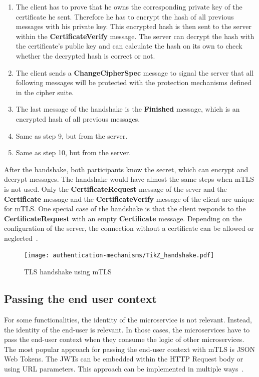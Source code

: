 \begin{enumerate}
	\item The client has to prove that he owns the corresponding private key of the certificate he sent.
		Therefore he has to encrypt the hash of all previous messages with his private key.
		This encrypted hash is then sent to the server within the \textbf{CertificateVerify} message.
		The server can decrypt the hash with the certificate's public key and can calculate the hash on its own to check whether the decrypted hash is correct or not.
	\item The client sends a \textbf{ChangeCipherSpec} message to signal the server that all following messages will be protected with the protection mechanisms defined in the cipher suite.
	\item The last message of the handshake is the \textbf{Finished} message, which is an encrypted hash of all previous messages.
	\item Same as step 9, but from the server.
	\item Same as step 10, but from the server.
\end{enumerate}
After the handshake, both participants know the secret, which can encrypt and decrypt messages.
The handshake would have almost the same steps when mTLS is not used.
Only the \textbf{CertificateRequest} message of the sever and the \textbf{Certificate} message and the \textbf{CertificateVerify} message of the client are unique for mTLS.
One special case of the handshake is that the client responds to the \textbf{CertificateRequest} with an empty \textbf{Certificate} message.
Depending on the configuration of the server, the connection without a certificate can be allowed or neglected~\cite{parsovs2013practical}.

\begin{figure}
	\centering
	\texttt{[image: authentication-mechanisms/TikZ\_handshake.pdf]}
	\caption{TLS handshake using mTLS~\cite{parsovs2013practical}}
	\label{fig:tlshandshake}
\end{figure}

\subsection{Passing the end user context} \label{sec:mtls_end_user_context}
For some functionalities, the identity of the microservice is not relevant. Instead, the identity of the end-user is relevant.
In those cases, the microservices have to pass the end-user context when they consume the logic of other microservices.
The most popular approach for passing the end-user context with mTLS is JSON Web Tokens.
The JWTs can be embedded within the HTTP Request body or using URL parameters.
This approach can be implemented in multiple ways~\cite{dias2020microservices}.

